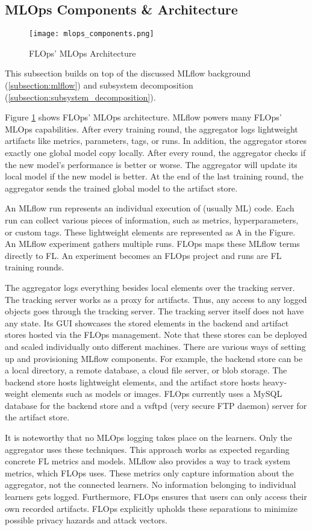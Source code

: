 \subsection{MLOps Components \& Architecture}

\begin{figure}[h]
    \centering
    \texttt{[image: mlops\_components.png]}
    \caption{FLOps' MLOps Architecture}
    \label{fig:mlops_architecture}
\end{figure}

This subsection builds on top of the discussed MLflow background (\ref{subsection:mlflow}) and subsystem decomposition (\ref{subsection:subsystem_decomposition}).

Figure \ref{fig:mlops_architecture} shows FLOps' MLOps architecture.
MLflow powers many FLOps' MLOps capabilities.
After every training round, the aggregator logs lightweight artifacts like metrics, parameters, tags, or runs.
In addition, the aggregator stores exactly one global model copy locally.
After every round, the aggregator checks if the new model's performance is better or worse.
The aggregator will update its local model if the new model is better.
At the end of the last training round, the aggregator sends the trained global model to the artifact store.

An MLflow run represents an individual execution of (usually ML) code.
Each run can collect various pieces of information, such as metrics, hyperparameters, or custom tags.
These lightweight elements are represented as A in the Figure.
An MLflow experiment gathers multiple runs.
FLOps maps these MLflow terms directly to FL.
An experiment becomes an FLOps project and runs are FL training rounds.

The aggregator logs everything besides local elements over the tracking server. 
The tracking server works as a proxy for artifacts.
Thus, any access to any logged objects goes through the tracking server.
The tracking server itself does not have any state.
Its GUI showcases the stored elements in the backend and artifact stores hosted via the FLOps management.
Note that these stores can be deployed and scaled individually onto different machines.
There are various ways of setting up and provisioning MLflow components.
For example, the backend store can be a local directory, a remote database, a cloud file server, or blob storage.
The backend store hosts lightweight elements, and the artifact store hosts heavy-weight elements such as models or images.
FLOps currently uses a MySQL database for the backend store and a vsftpd (very secure FTP daemon) server for the artifact store.

It is noteworthy that no MLOps logging takes place on the learners.
Only the aggregator uses these techniques.
This approach works as expected regarding concrete FL metrics and models.
MLflow also provides a way to track system metrics, which FLOps uses.
These metrics only capture information about the aggregator, not the connected learners.
No information belonging to individual learners gets logged.
Furthermore, FLOps ensures that users can only access their own recorded artifacts.
FLOps explicitly upholds these separations to minimize possible privacy hazards and attack vectors.